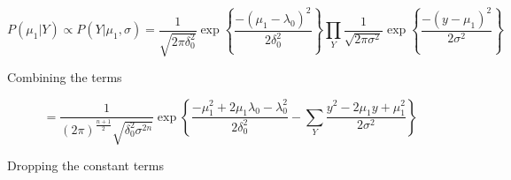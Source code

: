 \documentclass[12pt,a4paper,leqno]{report}
\theoremstyle{plain}
\theoremstyle{definition}
\theoremstyle{remark}
\begin{document}

\begin{def}\label{}
    \begin{equation}\label{}
        P(\mu_1|Y)
        \propto
        P(Y|\mu_1, \sigma)
        =
        \frac{1}
        {{\sqrt {2\pi \delta_0^2} }}
        \exp{
            \left \{
            \frac{
                -(\mu_1 - \lambda_0)^2
            }
            {2\delta_0^2}
            \right \}
        }
        \prod_{Y}
        \frac{1}
        {{\sqrt {2\pi \sigma^2} }}
        \exp{
            \left \{
            \frac{-(y - \mu_1)^2}
            {2\sigma^2}
            \right \}
        }
    \end{equation}
\end{def}Combining the terms
\begin{def}\label{}
    \begin{equation}\label{}
        =
        \frac{1}
        {
            (2\pi)^{\frac{n+1}{2}}
            \sqrt{ \delta_0^2 \sigma^{2n}}
        }
        \exp{
            \left \{
            \frac{- \mu_1^2 + 2 \mu_1 \lambda_0 - \lambda_0^2}{2\delta_0^2}
            -
            \sum_{Y}
            \frac{y^2 - 2 \mu_1 y + \mu_1^2}{2\sigma^2}
            \right \}
        }
    \end{equation}
\end{def}Dropping the constant terms
\end{document}
